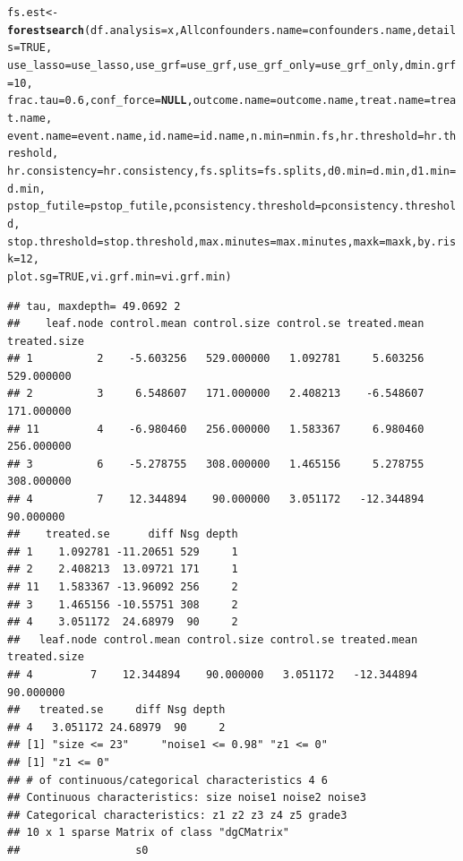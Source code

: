 \documentclass[smallextended]{svjour3}
\makeatletter
\newcommand{\hlnum}[1]{\textcolor[rgb]{0.686,0.059,0.569}{#1}}%
\newcommand{\hlstd}[1]{\textcolor[rgb]{0.345,0.345,0.345}{#1}}%
\newcommand{\hlkwa}[1]{\textcolor[rgb]{0.161,0.373,0.58}{\textbf{#1}}}%
\newcommand{\hlkwb}[1]{\textcolor[rgb]{0.69,0.353,0.396}{#1}}%
\newcommand{\hlkwc}[1]{\textcolor[rgb]{0.333,0.667,0.333}{#1}}%
\newcommand{\hlkwd}[1]{\textcolor[rgb]{0.737,0.353,0.396}{\textbf{#1}}}%
\newenvironment{kframe}{%
 \def\at@end@of@kframe{}%
 \ifinner\ifhmode%
  \def\at@end@of@kframe{\end{minipage}}%
  \begin{minipage}{\columnwidth}%
 \fi\fi%
 \def\FrameCommand##1{\hskip\@totalleftmargin \hskip-\fboxsep
 \colorbox{shadecolor}{##1}\hskip-\fboxsep
     \hskip-\linewidth \hskip-\@totalleftmargin \hskip\columnwidth}%
 \MakeFramed {\advance\hsize-\width
   \@totalleftmargin\z@ \linewidth\hsize
   \@setminipage}}%
 {\par\unskip\endMakeFramed%
 \at@end@of@kframe}
\newenvironment{knitrout}{}{} %
\makeatother
\begin{document}
\begin{knitrout}
\begin{kframe}
\begin{alltt}
\hlstd{fs.est} \hlkwb{<-} \hlkwd{forestsearch}\hlstd{(}\hlkwc{df.analysis} \hlstd{= x,} \hlkwc{Allconfounders.name} \hlstd{= confounders.name,} \hlkwc{details} \hlstd{=} \hlnum{TRUE}\hlstd{,}
    \hlkwc{use_lasso} \hlstd{= use_lasso,} \hlkwc{use_grf} \hlstd{= use_grf,} \hlkwc{use_grf_only} \hlstd{= use_grf_only,} \hlkwc{dmin.grf} \hlstd{=} \hlnum{10}\hlstd{,}
    \hlkwc{frac.tau} \hlstd{=} \hlnum{0.6}\hlstd{,} \hlkwc{conf_force} \hlstd{=} \hlkwa{NULL}\hlstd{,} \hlkwc{outcome.name} \hlstd{= outcome.name,} \hlkwc{treat.name} \hlstd{= treat.name,}
    \hlkwc{event.name} \hlstd{= event.name,} \hlkwc{id.name} \hlstd{= id.name,} \hlkwc{n.min} \hlstd{= nmin.fs,} \hlkwc{hr.threshold} \hlstd{= hr.threshold,}
    \hlkwc{hr.consistency} \hlstd{= hr.consistency,} \hlkwc{fs.splits} \hlstd{= fs.splits,} \hlkwc{d0.min} \hlstd{= d.min,} \hlkwc{d1.min} \hlstd{= d.min,}
    \hlkwc{pstop_futile} \hlstd{= pstop_futile,} \hlkwc{pconsistency.threshold} \hlstd{= pconsistency.threshold,}
    \hlkwc{stop.threshold} \hlstd{= stop.threshold,} \hlkwc{max.minutes} \hlstd{= max.minutes,} \hlkwc{maxk} \hlstd{= maxk,} \hlkwc{by.risk} \hlstd{=} \hlnum{12}\hlstd{,}
    \hlkwc{plot.sg} \hlstd{=} \hlnum{TRUE}\hlstd{,} \hlkwc{vi.grf.min} \hlstd{= vi.grf.min)}
\end{alltt}
\begin{verbatim}
## tau, maxdepth= 49.0692 2 
##    leaf.node control.mean control.size control.se treated.mean treated.size
## 1          2    -5.603256   529.000000   1.092781     5.603256   529.000000
## 2          3     6.548607   171.000000   2.408213    -6.548607   171.000000
## 11         4    -6.980460   256.000000   1.583367     6.980460   256.000000
## 3          6    -5.278755   308.000000   1.465156     5.278755   308.000000
## 4          7    12.344894    90.000000   3.051172   -12.344894    90.000000
##    treated.se      diff Nsg depth
## 1    1.092781 -11.20651 529     1
## 2    2.408213  13.09721 171     1
## 11   1.583367 -13.96092 256     2
## 3    1.465156 -10.55751 308     2
## 4    3.051172  24.68979  90     2
##   leaf.node control.mean control.size control.se treated.mean treated.size
## 4         7    12.344894    90.000000   3.051172   -12.344894    90.000000
##   treated.se     diff Nsg depth
## 4   3.051172 24.68979  90     2
## [1] "size <= 23"     "noise1 <= 0.98" "z1 <= 0"       
## [1] "z1 <= 0"
## # of continuous/categorical characteristics 4 6 
## Continuous characteristics: size noise1 noise2 noise3 
## Categorical characteristics: z1 z2 z3 z4 z5 grade3 
## 10 x 1 sparse Matrix of class "dgCMatrix"
##                  s0

\end{verbatim}
\end{kframe}
\end{knitrout}
\end{document}
